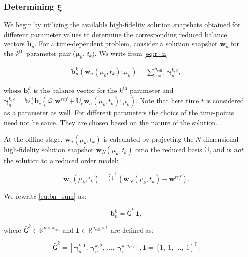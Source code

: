 \documentclass[11pt]{article}
\renewcommand{\vec}[1]{\mathbf{#1}}
\newcommand{\mat}[1]{\mathsf{#1}}
\begin{document}
        \subsubsection*{Determining $\boldsymbol{\xi}$}

        We begin by utilizing the available high-fidelity solution snapshots obtained for different parameter values to determine the corresponding reduced balance vectors $\vec{b}_n$.
        For a time-dependent problem, consider a solution snapshot $\vec{w}_n$ for the $k^{\text{th}}$ parameter pair ($\boldsymbol\mu_k$, $t_k$).
        We write from \cref{eq:r_n}

        \begin{align}
        \vec{b}^{k}_n(\vec{w}_n(\mu_k, t_k); \mu_k) = \sum_{e=1}^{n_{\text{cell}}} \boldsymbol{\gamma}^{k,e}_{n},
        \label{eq:bn_sum}
        \end{align}

        where $\vec{b}^{k}_n$ is the balance vector for the $k^{\text{th}}$ parameter and $\boldsymbol{\gamma}^{k,e}_{n} = \mathbb{W}_e^{\top} \vec{b}_e (\mathcal{Q}_e\vec{w}^{ref} + \widetilde{\mathbb{U}}_e \vec{w}_n(\mu_k, t_k); \mu_k)$.
        Note that here time $t$ is considered as a parameter as well.
        For different parameters the choice of the time-points need not be same.
        They are  chosen based on the nature of the solution.


        At the offline stage, $\vec{w}_n(\mu_k, t_k)$ is calculated by projecting the $N$-dimensional high-fidelity solution snapshot $\vec{w}_N(\mu_k, t_k)$ onto the reduced basis $\widetilde{\mathbb{U}}$, and is \textit{not} the solution to a reduced order model:

        \begin{equation}
        \vec{w}_n(\mu_k, t_k) = \widetilde{\mathbb{U}}^{\top} \left(\vec{w}_N(\mu_k, t_k)-\vec{w}^{ref}\right).
        \end{equation}

        We rewrite \cref{eq:bn_sum} as:

        \begin{equation}
        \vec{b}_n^{k} = \bar{\mat{G}}^{k}\, \vec{1},
        \label{eq:bn_G1}
        \end{equation}

        where $\bar{\mat{G}}^k \in \mathbb{R}^{n \times n_{\text{cell}}}$ and $\vec{1} \in \mathbb{R}^{n_{\text{cell}} \times 1}$ are defined as:

        \begin{subequations}
            \begin{equation}
            \bar{\mat{G}}^k = \left[ \boldsymbol{\gamma}_n^{k,1},\ \boldsymbol{\gamma}_n^{k,2},\ \dots,\ \boldsymbol{\gamma}_n^{k,n_{\text{cell}}} \right],
            \end{equation}
            \begin{equation}
            \vec{1} = \left[ 1,\ 1,\ \dots,\ 1 \right]^{\top}.
            \end{equation}
        \end{subequations}
\end{document}
